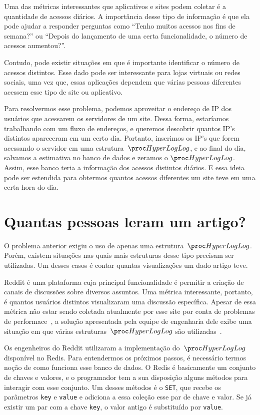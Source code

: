 Uma das métricas interessantes que aplicativos e sites podem coletar é a quantidade de acessos diários. A importância 
desse tipo de informação é que ela pode ajudar a responder perguntas como ``Tenho muitos acessos nos fins de semana?'' 
ou ``Depois do lançamento de uma certa funcionalidade, o número de acessos aumentou?''.

Contudo, pode existir situações em que é importante identificar o número de acessos distintos. Esse dado pode ser 
interessante para lojas virtuais ou redes sociais, uma vez que, essas aplicações dependem que várias pessoas diferentes
acessem esse tipo de site ou aplicativo.

Para resolvermos esse problema, podemos aproveitar o endereço de IP dos usuários que acessarem os servidores de um site.
Dessa forma, estaríamos trabalhando com um fluxo de endereços, e queremos descobrir quantos IP's distintos apareceram em
um certo dia. Portanto, inserimos os IP's que forem acessando o servidor em uma estrutura~$\HLOG$, e ao final do dia, 
salvamos a estimativa no banco de dados e zeramos o $\HLOG$. Assim, esse banco teria a informação dos acessos distintos 
diários. E essa ideia pode ser estendida para obtermos quantos acessos diferentes um site teve em uma certa hora do dia.

\section{Quantas pessoas leram um artigo?}

O problema anterior exigiu o uso de apenas uma estrutura~$\HLOG$. Porém, existem situações nas quais mais estruturas 
desse tipo precisam ser utilizadas. Um desses casos é contar quantas visualizações um dado artigo teve.

Reddit é uma plataforma cuja principal funcionalidade é permitir a criação de canais de discussões sobre diversos 
assuntos. Uma métrica interessante, portanto, é quantos usuários distintos visualizaram uma discussão específica. Apesar
de essa métrica não estar sendo coletada atualmente por esse site por conta de problemas de 
performace~\citep{RedditDisabled}, a solução apresentada pela equipe de engenharia dele exibe uma situação em que várias 
estruturas~$\HLOG$ são utilizadas~\citep{Reddit}.

Os engenheiros do Reddit utilizaram a implementação do~$\HLOG$ disponível no Redis. Para entendermos os próximos passos,
é necessário termos noção de como funciona esse banco de dados. O Redis é basicamente um conjunto de chaves e valores, e
o programador tem a sua disposição alguns métodos para interagir com esse conjunto. Um desses métodos é o \texttt{SET},
que recebe os parâmetros \texttt{key} e \texttt{value} e adiciona a essa coleção esse par de chave e valor. Se já 
existir um par com a chave \texttt{key}, o valor antigo é substituído por \texttt{value}.

